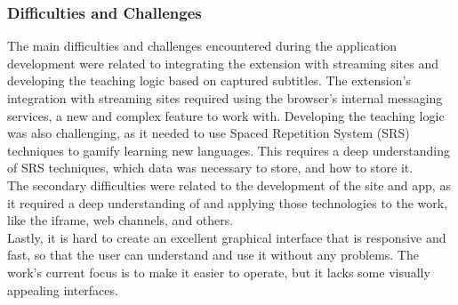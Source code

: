 \documentclass[12pt]{article}
\begin{document}
\subsubsection{Difficulties and Challenges}
The main difficulties and challenges encountered during the application development were related to integrating the extension with streaming sites and developing the teaching logic based on captured subtitles. The extension's integration with streaming sites required using the browser's internal messaging services, a new and complex feature to work with. Developing the teaching logic was also challenging, as it needed to use Spaced Repetition System (SRS) techniques to gamify learning new languages. This requires a deep understanding of SRS techniques, which data was necessary to store, and how to store it. \\
The secondary difficulties were related to the development of the site and app, as it required a deep understanding of and applying those technologies to the work, like the iframe, web channels, and others. \\
Lastly, it is hard to create an excellent graphical interface that is responsive and fast, so that the user can understand and use it without any problems. The work's current focus is to make it easier to operate, but it lacks some visually appealing interfaces.
\end{document}
